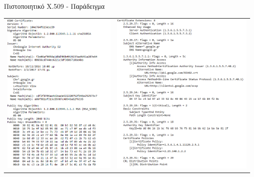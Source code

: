 \documentclass[handout]{beamer}
\begin{document}
\begin{frame}{Πιστοποιητικό X.509 - Παράδειγμα} 
    \begin{tabular}{ c c }
    \includegraphics[scale=0.41]{cer1.PNG} & \includegraphics[scale=0.41]{cer2.PNG}
    \end{tabular}  
\end{frame}
\end{document}

